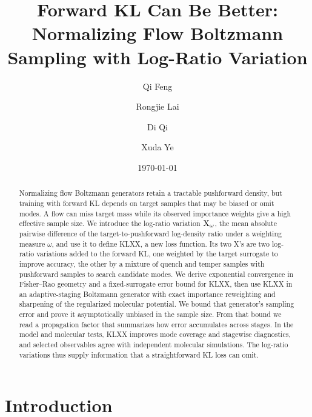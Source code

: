 \documentclass{article}
\title{Forward KL Can Be Better: Normalizing Flow Boltzmann Sampling with Log-Ratio Variation}
\author[1]{Qi Feng}
\author[2]{Rongjie Lai}
\author[2]{Di Qi}
\author[2]{Xuda Ye}
\affil[1]{Department of Mathematics, Florida State University, Tallahassee, FL 32306}
\affil[2]{Department of Mathematics, Purdue University, West Lafayette, IN 47907}
\date{\today}
\begin{document}
\maketitle

\begin{abstract}
Normalizing flow Boltzmann generators retain a tractable pushforward density, but training with forward KL depends on target samples that may be biased or omit modes. A flow can miss target mass while its observed importance weights give a high effective sample size. We introduce the log-ratio variation $\mathrm{X}_\omega$, the mean absolute pairwise difference of the target-to-{pushforward} log-density ratio under a weighting measure $\omega$, and use it to define KLXX, a new loss function. Its two X's are {\color{blue}two log-ratio variations} added to the forward KL, one weighted by the target surrogate {\color{blue}to improve accuracy}, the other by a mixture of quench and temper samples with pushforward samples {\color{blue}to search candidate modes}. We derive exponential convergence in Fisher--Rao geometry and a fixed-surrogate error bound for KLXX, then use KLXX in an adaptive-staging Boltzmann generator with exact importance reweighting and sharpening of the regularized molecular potential. We bound that generator's sampling error and {\color{purple}prove it asymptotically unbiased} in the sample size. From that bound we read a propagation factor that summarizes how error accumulates across stages. In the model and molecular tests, KLXX improves mode coverage and stagewise diagnostics, and selected observables agree with independent molecular simulations. The log-ratio variations thus supply information that a straightforward KL loss can omit.
\end{abstract}

\par\medskip
\noindent{}
\par\medskip

\section{Introduction}
\label{sec: intro}
\end{document}
